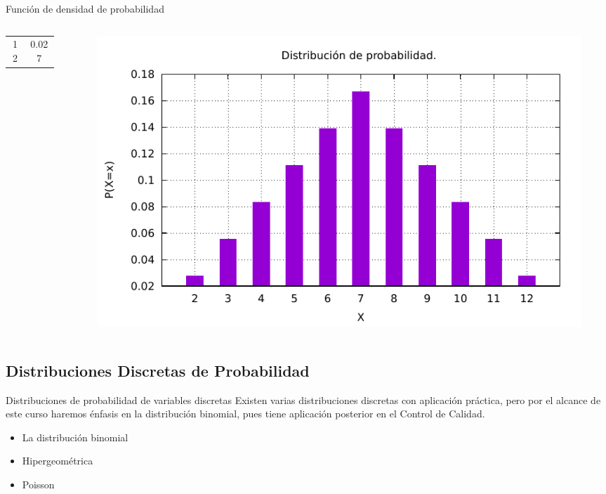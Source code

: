 \documentclass[11pt]{beamer}
\begin{document}
\begin{frame}{Función de densidad de probabilidad}
\begin{columns}
\begin{column}{0.4\textwidth}
\begin{center}
\begin{tabular}{c|c}
                            12 & 0.027 \\
                        \end{tabular}
                    \end{center}
                \end{column}
                \begin{column}{0.56\textwidth}
                    \begin{figure}
                        \centering
                        \includegraphics[width=1\linewidth]{images/p1}
                        \label{fig:p1}
                    \end{figure}
                \end{column}
            \end{columns}
        \end{frame}

      \subsection*{Distribuciones Discretas de Probabilidad}

        \begin{frame}{Distribuciones de probabilidad de variables discretas}
          Existen varias distribuciones discretas con aplicación práctica, pero por el alcance de este curso haremos énfasis en la distribución binomial, pues tiene aplicación posterior en el Control de Calidad.
          \begin{itemize}
              \item La distribución binomial
              \item Hipergeométrica
              \item Poisson
          \end{itemize}
        \end{frame}
\end{document}

